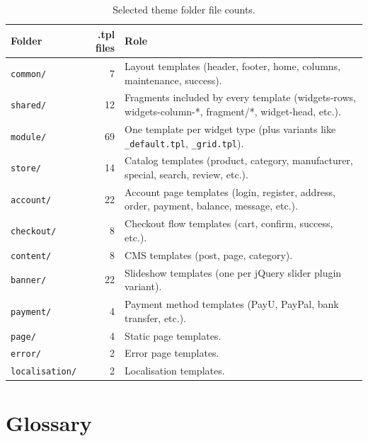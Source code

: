\documentclass[11pt,a4paper]{article}
\begin{document}
\begin{table}[htbp]
\centering
\caption{Selected theme folder file counts.}\label{tab:theme-counts}
\small
\begin{tabularx}{\columnwidth}{lrX}
\toprule
\textbf{Folder} & \textbf{.tpl files} & \textbf{Role} \\
\midrule
\texttt{common/}    & 7  & Layout templates (header, footer, home, columns, maintenance, success). \\
\texttt{shared/}    & 12 & Fragments included by every template (widgets-rows, widgets-column-*, fragment/*, widget-head, etc.). \\
\texttt{module/}    & 69 & One template per widget type (plus variants like \texttt{\_default.tpl}, \texttt{\_grid.tpl}). \\
\texttt{store/}     & 14 & Catalog templates (product, category, manufacturer, special, search, review, etc.). \\
\texttt{account/}   & 22 & Account page templates (login, register, address, order, payment, balance, message, etc.). \\
\texttt{checkout/}  & 8  & Checkout flow templates (cart, confirm, success, etc.). \\
\texttt{content/}   & 8  & CMS templates (post, page, category). \\
\texttt{banner/}    & 22 & Slideshow templates (one per jQuery slider plugin variant). \\
\texttt{payment/}   & 4  & Payment method templates (PayU, PayPal, bank transfer, etc.). \\
\texttt{page/}      & 4  & Static page templates. \\
\texttt{error/}     & 2  & Error page templates. \\
\texttt{localisation/} & 2 & Localisation templates. \\
\bottomrule
\end{tabularx}
\end{table}

\section{Glossary}\label{app:glossary}
\end{document}
